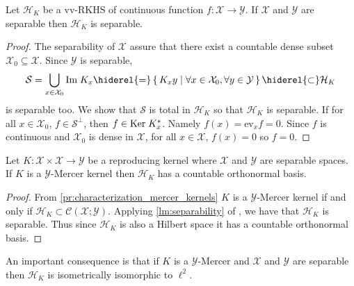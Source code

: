 \begin{lemma}
\label{lm:separability}
Let $\mathcal{H}_K$ be a \acl{vv-RKHS} of continuous function $f:\mathcal{X}\to\mathcal{Y}$. If $\mathcal{X}$ and $\mathcal{Y}$ are separable then $\mathcal{H}_K$ is separable.
\end{lemma}
\begin{proof}
The separability of $\mathcal{X}$ assure that there exist a countable dense subset $\mathcal{X}_0\subseteq\mathcal{X}$. Since $\mathcal{Y}$ is separable,
\begin{dmath*}
\mathcal{S}=\bigcup_{x\in\mathcal{X}_0}\Ima K_x \hiderel{=}\set{K_xy|\forall x\in\mathcal{X}_0, \forall y\in\mathcal{Y}}\hiderel{\subset} \mathcal{H}_K
\end{dmath*}
is separable too. We show that $\mathcal{S}$ is total in $\mathcal{H}_K$ so that $\mathcal{H}_K$ is separable. If for all $x\in\mathcal{X}_0$, $f\in\mathcal{S}^{\perp}$, then $f\in\text{Ker}\; K_x^*$. Namely $f(x)=\text{ev}_xf=0$. Since $f$ is continuous and $\mathcal{X}_0$ is dense in $\mathcal{X}$, for all $x\in\mathcal{X}$, $f(x)=0$ so $f=0$.
\end{proof}

\begin{proposition}
\label{pr:mercer_countable_basis}
Let $K:\mathcal{X}\times\mathcal{X}\to\mathcal{Y}$ be a reproducing kernel where $\mathcal{X}$ and $\mathcal{Y}$ are separable spaces. If $K$ is a $\mathcal{Y}$-Mercer kernel then $\mathcal{H}_K$ has a countable orthonormal basis.
\end{proposition}
\begin{proof}
From \cref{pr:characterization_mercer_kernels} $K$ is a $\mathcal{Y}$-Mercer kernel if and only if $\mathcal{H}_K\subset \mathcal{C}(\mathcal{X};\mathcal{Y})$. Applying \cref{lm:separability} of \cite{carmeli2006vector}, we have that $\mathcal{H}_K$ is separable. Thus since $\mathcal{H}_K$ is also a Hilbert space it has a countable orthonormal basis.
\end{proof}
An important consequence is that if $K$ is a $\mathcal{Y}$-Mercer and $\mathcal{X}$ and $\mathcal{Y}$ are separable then $\mathcal{H}_K$ is isometrically isomorphic to $\ell^2$.

